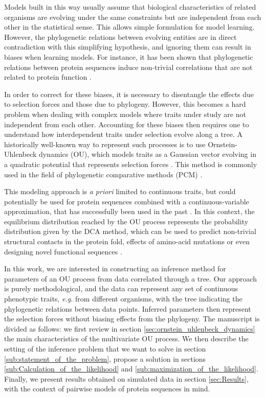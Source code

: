 \documentclass[preprint,amsmath,amssymb,superscriptaddress,showpacs,pre]{revtex4-1}
\begin{document}
Models built in this way usually assume that biological characteristics of related organisms are evolving under the same constraints but are independent from each other in the statistical sense. 
This allows simple formulation for model learning. 
However, the phylogenetic relations between evolving entities are in direct contradiction with this simplifying hypothesis, and ignoring them can result in biases when learning models. 
For instance, it has been shown that phylogenetic relations between protein sequences induce non-trivial correlations that are not related to protein function \cite{qin_power_2018}. 

In order to correct for these biases, it is necessary to disentangle the effects due to selection forces and those due to phylogeny. 
However, this becomes a hard problem when dealing with complex models where traits under study are not independent from each other. 
Accounting for these biases then requires one to understand how interdependent traits under selection evolve along a tree. 
A historically well-known way to represent such processes is to use Ornstein-Uhlenbeck dynamics (OU), which models traits as a Gaussian vector evolving in a quadratic potential that represents selection forces \cite{uhlenbeck_theory_1930, felsenstein_phylogenies_1988, hansen_stabilizing_1997}.
This method is commonly used in the field of phylogenetic comparative methods (PCM) \cite{bartoszek_phylogenetic_2012,mitov_fast_2020}. 

This modeling approach is \emph{a priori} limited to continuous traits, but could potentially be used for protein sequences combined with a continuous-variable approximation, that has successfully been used in the past \cite{jones_psicov_2012,barton_large_2014,baldassi_fast_2014}. 
In this context, the equilibrium distribution reached by the OU process represents the probability distribution given by the DCA method, which can be used to predict non-trivial structural contacts in the protein fold, effects of amino-acid mutations or even designing novel functional sequences \cite{morcos_direct-coupling_2011, figliuzzi_coevolutionary_2016, russ_evolution-based_2020}. 


In this work, we are interested in constructing an inference method for parameters of an OU process from data correlated through a tree.
Our approach is purely methodological, and the data can represent any set of continuous phenotypic traits, \emph{e.g.} from different organisms, with the tree indicating the phylogenetic relations between data points. 
Inferred parameters then represent the selection forces without biasing effects from the phylogeny. 
The manuscript is divided as follows: we first review in section \ref{sec:ornstein_uhlenbeck_dynamics} the main characteristics of the multivariate OU process. 
We then describe the setting of the inference problem that we want to solve in section \ref{sub:statement_of_the_problem}, propose a solution in sections \ref{sub:Calculation_of_the_likelihood} and \ref{sub:maximization_of_the_likelihood}.
Finally, we present results obtained on simulated data in section \ref{sec:Results}, with the context of pairwise models of protein sequences in mind. 
\end{document}
